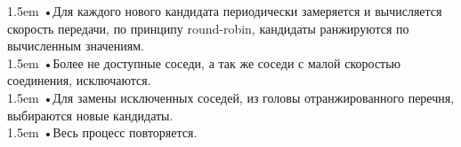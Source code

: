 \documentclass[10pt,a4paper]{article}
\begin{document}
\hangindent 1.5em
\noindent   
•\quad Для каждого нового кандидата периодически замеряется и вычисляется скорость передачи, по принципу round-robin, кандидаты ранжируются по вычисленным значениям.
\vspace{-0.8em}
\\

\hangindent 1.5em
\noindent   
•\quad Более не доступные соседи, а так же соседи с малой скоростью соединения, исключаются.
\vspace{-0.8em}
\\

\hangindent 1.5em
\noindent   
•\quad Для замены исключенных соседей, из головы отранжированного перечня, выбираются новые кандидаты.
\vspace{-0.8em}
\\

\hangindent 1.5em
\noindent   
•\quad Весь процесс повторяется.
\vspace{-0.6em}
\\ 
\end{document}
